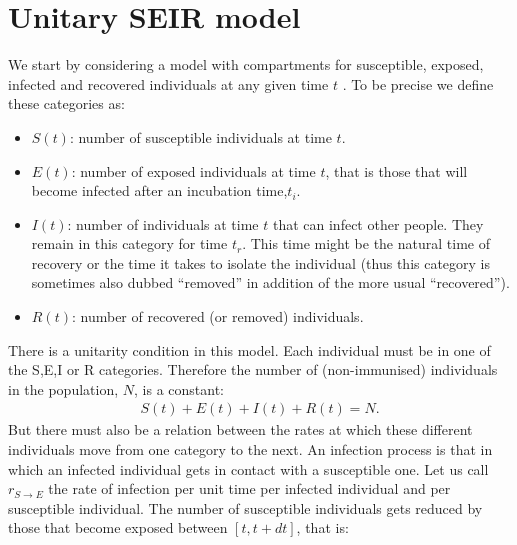\documentclass[a4paper,oneside,11pt]{article}
\begin{document}
\section{Unitary SEIR model}
\label{sec:useir}
We start by considering a model with compartments for susceptible, exposed, infected and recovered individuals at any given time $t$ \cite{}. To be precise we define these categories
as:
\begin{itemize}
\item $S(t)$: number of susceptible individuals at time $t$.
\item $E(t)$: number of exposed individuals at time $t$, that is those that will become infected after an incubation time,$t_i$.
\item $I(t)$: number of individuals at time $t$ that can infect other people. They remain in this category for time $t_r$. This time might be the natural time of recovery or the time it takes to isolate the individual (thus this category is sometimes also dubbed ``removed'' in addition of the more usual ``recovered'').
\item $R(t)$: number of recovered (or removed) individuals.
\end{itemize}
There is a unitarity condition in this model.  Each individual must be in one of the S,E,I or R categories. Therefore the number of (non-immunised) individuals in the population, $N$, is a constant:
\begin{eqnarray}
S(t)+ E(t)+I(t)+R(t) = N.
\end{eqnarray}
But there must also be a relation between the rates at which these different individuals move from one category to the next. An infection process is that in which an infected individual gets in contact with a susceptible one. Let us call $r_{S\rightarrow E}$ the rate of infection per unit time
per infected individual and per susceptible individual. The number of susceptible individuals gets reduced by those that become exposed between $[t, t+dt]$, that is:
\end{document}
